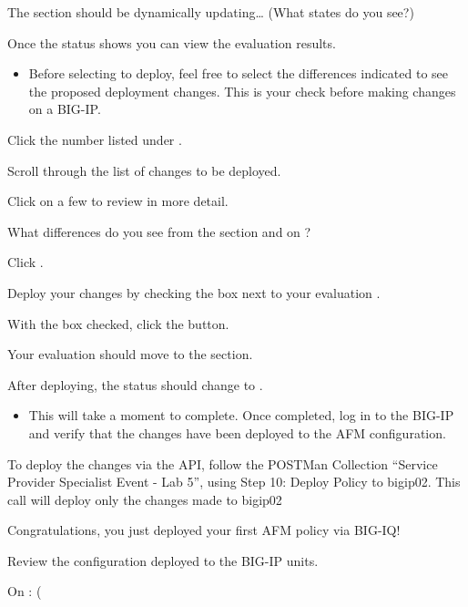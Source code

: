 \documentclass[letterpaper,10pt,english]{sphinxmanual}
\begin{document}
The  section should be dynamically updating… (What states do
you see?)

Once the status shows  you can view the
evaluation results.
\begin{itemize}
\item {} 
Before selecting to deploy, feel free to select the differences
indicated to see the proposed deployment changes. This is your check
before making changes on a BIG-IP.

\end{itemize}

Click the number listed under .

Scroll through the list of changes to be deployed.

Click on a few to review in more detail.


What differences do you see from the  section
and on ?

Click .

Deploy your changes by checking the box next to your evaluation
.

With the box checked, click the  button.

Your evaluation should move to the  section.

After deploying, the status should change to .
\begin{itemize}
\item {} 
This will take a moment to complete. Once completed, log in to the
BIG-IP and verify that the changes have been deployed to the AFM
configuration.

\end{itemize}

To deploy the changes via the API, follow the POSTMan Collection
“Service Provider Specialist Event - Lab 5”, using Step 10: Deploy
Policy to bigip02. This call will deploy only the changes made to
bigip02

Congratulations, you just deployed your first AFM policy via BIG-IQ!

Review the configuration deployed to the BIG-IP units.

On : (
\end{document}
